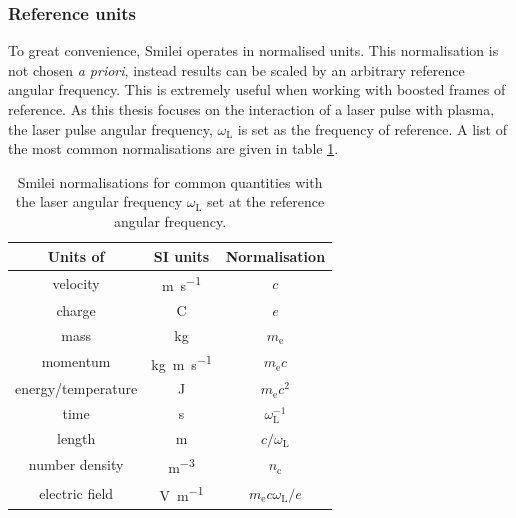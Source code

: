 \subsubsection{Reference units}
To great convenience, Smilei operates in normalised units. This normalisation is not chosen \textit{a priori}, instead results can be scaled by an arbitrary reference angular frequency. This is extremely useful when working with boosted frames of reference. As this thesis focuses on the interaction of a laser pulse with plasma, the laser pulse angular frequency, $\omega_\mathrm{L}$ is set as the frequency of reference. A list of the most common normalisations are given in table \ref{tab:intro-normalisations}.

\begin{table}
\begin{center}
\begin{tabular}{ccc}
	 \hline \hline
	Units of & SI units & Normalisation \\
	\hline
	velocity & \unit{m.s^{-1}} & $c$ \\
	charge & C & $e$ \\
	mass & kg & $m_\mathrm{e}$ \\
	momentum & \unit{kg.m.s^{-1}} & $m_\mathrm{e}c$ \\
	energy/temperature & J & $m_\mathrm{e}c^2$ \\
	time & s & $\omega^{-1}_\mathrm{L}$ \\
	length & m & $c/\omega_\mathrm{L}$ \\
	number density & \unit{m^{-3}} & $n_\mathrm{c}$ \\
	electric field & \unit{V.m^{-1}} & $m_\mathrm{e}c\omega_\mathrm{L}/e$ \\
	\hline \hline
\end{tabular}
	\caption{\label{tab:intro-normalisations} Smilei normalisations for common quantities with the laser angular frequency $\omega_\mathrm{L}$ set at the reference angular frequency.}
\end{center}
\end{table}




